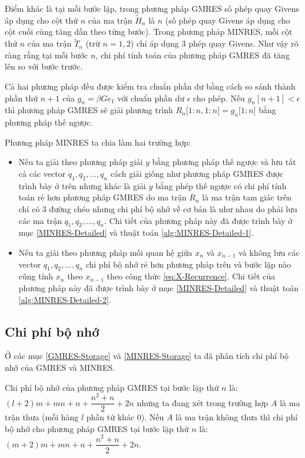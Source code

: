 \documentclass[14pt, a4paper]{article}
\numberwithin{equation}{section}
\numberwithin{algorithm}{section}
\numberwithin{figure}{section}
\numberwithin{dl}{section}
\numberwithin{md}{section}
\numberwithin{bd}{section}
\numberwithin{dn}{section}
\numberwithin{hq}{section}
\begin{document}
Điểm khác là tại mỗi bước lặp, trong phương pháp GMRES số phép quay Givens áp dụng cho cột thứ $n$ của ma trận $\widetilde{H}_n$ là $n$ (số phép quay Givens áp dụng cho cột cuối cùng tăng dần theo từng bước). Trong phương pháp MINRES, mỗi cột thứ $n$ của ma trận $\widetilde{T}_n$ (trừ $n=1,2$) chỉ áp dụng 3 phép quay Givens. Như vậy rõ ràng rằng tại mỗi bước $n$, chi phí tính toán của phương pháp GMRES đã tăng lên so với bước trước.

Cả hai phương pháp đều được kiểm tra chuẩn phần dư bằng cách so sánh thành phần thứ $n+1$ của $g_n=\beta G e_1$ với chuẩn phần dư $\epsilon$ cho phép. Nếu $g_n[n+1] < \epsilon$ thì phương pháp GMRES sẽ giải phương trình $R_n \lbrack 1:n, 1:n \rbrack = g_n \lbrack 1:n \rbrack$ bằng phương pháp thế ngược.

Phương pháp MINRES ta chia làm hai trường hợp:

\begin{itemize}
    \item Nếu ta giải theo phương pháp giải $y$ bằng phương pháp thế ngược và lưu tất cả các vector $q_1, q_2, \dots, q_n$ cách giải giống như phương pháp GMRES được trình bày ở trên nhưng khác là giải $y$ bằng phép thế ngược có chi phí tính toán rẻ hơn phương pháp GMRES do ma trận $R_n$ là ma trận tam giác trên chỉ có 3 đường chéo nhưng chi phí bộ nhớ về cơ bản là như nhau do phải lưu các ma trận $q_1, q_2, \dots, q_n$. Chi tiết của phương pháp này đã được trình bày ở mục \ref{MINRES-Detailed} và thuật toán \ref{alg:MINRES-Detailed-1}.
    \item Nếu ta giải theo phương pháp mối quan hệ giữa $x_n$ và $x_{n-1}$ và không lưu các vector $q_1, q_2, \dots, q_n$ chi phí bộ nhớ rẻ hơn phương pháp trên và bước lặp nào cũng tính $x_n$ theo $x_{n-1}$ theo công thức \ref{eq:X-Recurrence}. Chi tiết của phương pháp này đã được trình bày ở mục \ref{MINRES-Detailed} và thuật toán \ref{alg:MINRES-Detailed-2}.
\end{itemize}

\subsection{Chi phí bộ nhớ}

Ở các mục \ref{GMRES-Storage} và \ref{MINRES-Storage} ta đã phân tích chi phí bộ nhớ của GMRES và MINRES.

Chi phí bộ nhớ của phương pháp GMRES tại bước lặp thứ $n$ là: $(l+2)m + mn + n + \dfrac{n^2 + n}{2} + 2n$ nhưng ta đang xét trong trường hợp $A$ là ma trận thưa (mỗi hàng $l$ phần tử khác 0). Nếu $A$ là ma trận không thưa thì chi phí bộ nhớ cho phương pháp GMRES tại bước lặp thứ $n$ là: $(m+2)m + mn + n + \dfrac{n^2 + n}{2} + 2n$.
\end{document}

